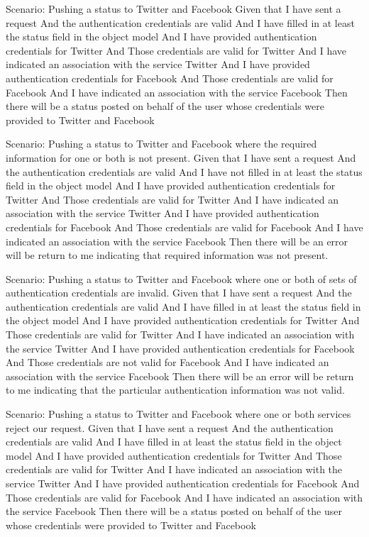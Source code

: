 \documentclass[12pt]{article}
\begin{document}
Scenario: Pushing a status to Twitter and Facebook
	Given that I have sent a request
	And the authentication credentials are valid
	And I have filled in at least the status field in the object model
	And I have provided authentication credentials for Twitter
	And Those credentials are valid for Twitter
	And I have indicated an association with the service Twitter
	And I have provided authentication credentials for Facebook
	And Those credentials are valid for Facebook
	And I have indicated an association with the service Facebook
	Then there will be a status posted on behalf of the user whose credentials 
	were provided to Twitter and Facebook

Scenario: Pushing a status to Twitter and Facebook where the required 
information for one or both is not present.
	Given that I have sent a request
	And the authentication credentials are valid
	And I have not filled in at least the status field in the object model
	And I have provided authentication credentials for Twitter
	And Those credentials are valid for Twitter
	And I have indicated an association with the service Twitter
	And I have provided authentication credentials for Facebook
	And Those credentials are valid for Facebook
	And I have indicated an association with the service Facebook
	Then there will be an error will be return to me indicating that required 
	information was not present.

Scenario: Pushing a status to Twitter and Facebook where one or both of sets of 
authentication credentials are invalid.
	Given that I have sent a request
	And the authentication credentials are valid
	And I have filled in at least the status field in the object model
	And I have provided authentication credentials for Twitter
	And Those credentials are valid for Twitter
	And I have indicated an association with the service Twitter
	And I have provided authentication credentials for Facebook
	And Those credentials are not valid for Facebook
	And I have indicated an association with the service Facebook
	Then there will be an error will be return to me indicating that the 
	particular authentication information was not valid. 


Scenario: Pushing a status to Twitter and Facebook where one or both services 
reject our request.
	Given that I have sent a request
	And the authentication credentials are valid
	And I have filled in at least the status field in the object model
	And I have provided authentication credentials for Twitter
	And Those credentials are valid for Twitter
	And I have indicated an association with the service Twitter
	And I have provided authentication credentials for Facebook
	And Those credentials are valid for Facebook
	And I have indicated an association with the service Facebook
	Then there will be a status posted on behalf of the user whose credentials 
	were provided to Twitter and Facebook
\end{document}
